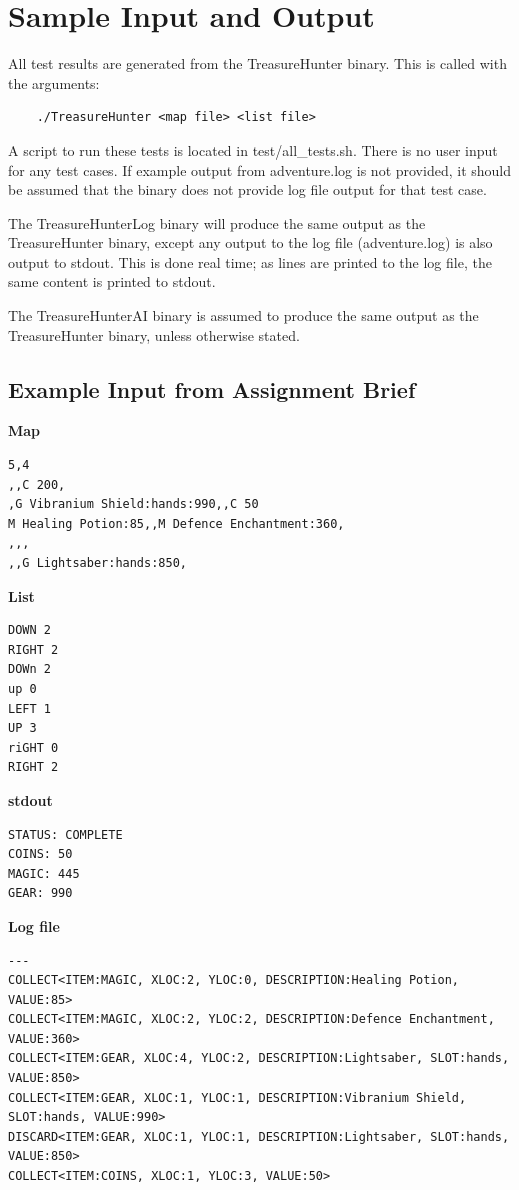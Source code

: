 \documentclass{article}
\begin{document}
\section{Sample Input and Output}
All test results are generated from the TreasureHunter binary.
This is called with the arguments:
\begin{lstlisting}
    ./TreasureHunter <map file> <list file>
\end{lstlisting}
A script to run these tests is located in test/all\_tests.sh.
There is no user input for any test cases.
If example output from adventure.log is not provided, it should be assumed that the binary
does not provide log file output for that test case.

The TreasureHunterLog binary will produce the same output as the TreasureHunter binary,
except any output to the log file (adventure.log) is also output to stdout. This is done
real time; as lines are printed to the log file, the same content is printed to stdout.

The TreasureHunterAI binary is assumed to produce the same output as the TreasureHunter binary,
unless otherwise stated.

\subsection{Example Input from Assignment Brief}
\quad \textbf{Map}
\begin{lstlisting}
5,4
,,C 200,
,G Vibranium Shield:hands:990,,C 50
M Healing Potion:85,,M Defence Enchantment:360,
,,,
,,G Lightsaber:hands:850,
\end{lstlisting}

\textbf{List}
\begin{lstlisting}
DOWN 2
RIGHT 2
DOWn 2
up 0
LEFT 1
UP 3
riGHT 0
RIGHT 2
\end{lstlisting}
\pagebreak

\textbf{stdout}
\begin{lstlisting}
STATUS: COMPLETE
COINS: 50
MAGIC: 445
GEAR: 990
\end{lstlisting}

\textbf{Log file}
\begin{lstlisting}
---
COLLECT<ITEM:MAGIC, XLOC:2, YLOC:0, DESCRIPTION:Healing Potion, VALUE:85>
COLLECT<ITEM:MAGIC, XLOC:2, YLOC:2, DESCRIPTION:Defence Enchantment, VALUE:360>
COLLECT<ITEM:GEAR, XLOC:4, YLOC:2, DESCRIPTION:Lightsaber, SLOT:hands, VALUE:850>
COLLECT<ITEM:GEAR, XLOC:1, YLOC:1, DESCRIPTION:Vibranium Shield, SLOT:hands, VALUE:990>
DISCARD<ITEM:GEAR, XLOC:1, YLOC:1, DESCRIPTION:Lightsaber, SLOT:hands, VALUE:850>
COLLECT<ITEM:COINS, XLOC:1, YLOC:3, VALUE:50>
\end{lstlisting}
\end{document}
